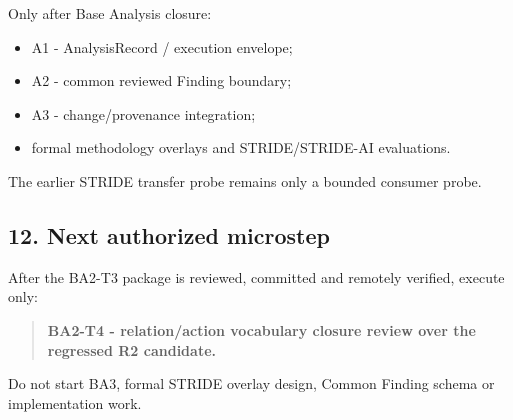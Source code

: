 \documentclass[
  10pt,
  a4paper,
]{article}
\providecommand{\tightlist}{%
  \setlength{\itemsep}{0pt}\setlength{\parskip}{0pt}}
\begin{document}
Only after Base Analysis closure:

\begin{itemize}
\tightlist
\item
  A1 - AnalysisRecord / execution envelope;
\item
  A2 - common reviewed Finding boundary;
\item
  A3 - change/provenance integration;
\item
  formal methodology overlays and STRIDE/STRIDE-AI evaluations.
\end{itemize}

The earlier STRIDE transfer probe remains only a bounded consumer probe.

\subsection{12. Next authorized
microstep}\label{12-next-authorized-microstep}

After the BA2-T3 package is reviewed, committed and remotely verified,
execute only:

\begin{quote}
\textbf{BA2-T4 - relation/action vocabulary closure review over the
regressed R2 candidate.}
\end{quote}

Do not start BA3, formal STRIDE overlay design, Common Finding schema or
implementation work.
\end{document}
